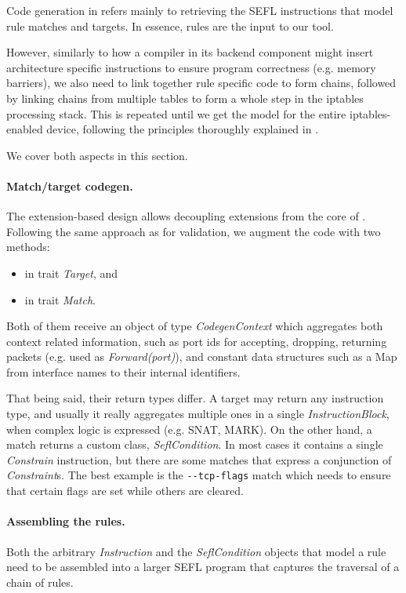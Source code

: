 {Code generation in \TOOL refers mainly to retrieving the SEFL instructions that
model rule matches and targets.  In essence, rules are the input to our tool.

However, similarly to how a compiler in its backend component might insert
architecture specific instructions to ensure program correctness (e.g. memory
barriers), we also need to link together rule specific code to form chains,
followed by linking chains from multiple tables to form a whole step in the
iptables processing stack.  This is repeated until we get the model for the
entire iptables-enabled device, following the principles thoroughly explained
in .

We cover both aspects in this section.

\paragraph{Match/target codegen.}  The extension-based design allows decoupling
extensions  from the core of \TOOL.  Following the same approach as for
validation, we augment the code with two methods:
\begin{itemize}
  \item {} in trait
    \emph{Target}, and
  \item {} in trait
    \emph{Match}.
\end{itemize}

Both of them receive an object of type \emph{CodegenContext} which aggregates
both context related information, such as port ids for accepting, dropping,
returning packets (e.g. used as \emph{Forward(port)}), and constant data
structures such as a Map from interface names to their internal identifiers.

That being said, their return types differ. A target may return any instruction
type, and usually it really aggregates multiple ones in a single
\emph{InstructionBlock}, when complex logic is expressed (e.g. SNAT, MARK). On
the other hand, a match returns a custom class, \emph{SeflCondition}.  In most
cases it contains a single \emph{Constrain} instruction, but there are some
matches that express a conjunction of \emph{Constraint}s.  The best example is
the \lstinline{--tcp-flags} match which needs to ensure that certain flags are
set while others are cleared.

\paragraph{Assembling the rules.}
Both the arbitrary \emph{Instruction} and the \emph{SeflCondition} objects that
model a rule need to be assembled into a larger SEFL program that captures the
traversal of a chain of rules.

}
